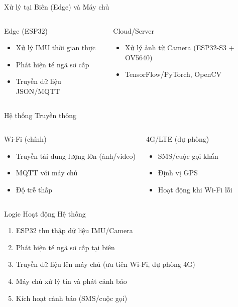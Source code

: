 \begin{frame}{Xử lý tại Biên (Edge) và Máy chủ }
\begin{columns}
\begin{block}{Edge (ESP32)}
\begin{itemize}
\item Xử lý IMU thời gian thực
\item Phát hiện té ngã sơ cấp
\item Truyền dữ liệu JSON/MQTT
\end{itemize}
\end{block}

\begin{block}{Cloud/Server}
\begin{itemize}
\item Xử lý ảnh từ Camera (ESP32-S3 + OV5640)
\item TensorFlow/PyTorch, OpenCV
\end{itemize}
\end{block}
\end{columns}
\end{frame}

\begin{frame}{Hệ thống Truyền thông}
\begin{columns}
\begin{alertblock}{Wi-Fi (chính)}
\begin{itemize}
\item Truyền tải dung lượng lớn (ảnh/video)
\item MQTT với máy chủ
\item Độ trễ thấp
\end{itemize}
\end{alertblock}

\begin{alertblock}{4G/LTE (dự phòng)}
\begin{itemize}
\item SMS/cuộc gọi khẩn
\item Định vị GPS
\item Hoạt động khi Wi-Fi lỗi
\end{itemize}
\end{alertblock}
\end{columns}
\end{frame}

\begin{frame}{Logic Hoạt động Hệ thống}
\begin{enumerate}
\item ESP32 thu thập dữ liệu IMU/Camera
\item Phát hiện té ngã sơ cấp tại biên
\item Truyền dữ liệu lên máy chủ (ưu tiên Wi-Fi, dự phòng 4G)
\item Máy chủ xử lý tin và phát cảnh báo
\item Kích hoạt cảnh báo (SMS/cuộc gọi)
\end{enumerate}
\end{frame}

